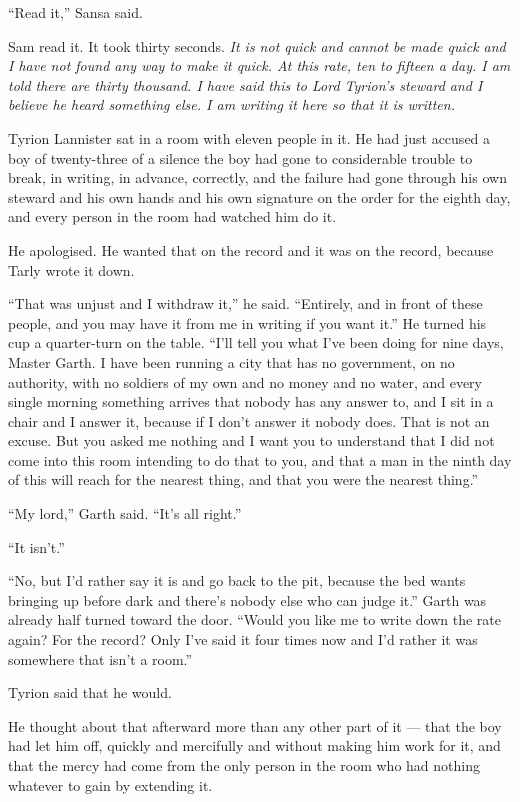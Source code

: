 “Read it,” Sansa said.

Sam read it. It took thirty seconds. \textit{It is not quick and cannot be made quick and I have not found any way to make it quick. At this rate, ten to fifteen a day. I am told there are thirty thousand. I have said this to Lord Tyrion’s steward and I believe he heard something else. I am writing it here so that it is written.}

Tyrion Lannister sat in a room with eleven people in it. He had just accused a boy of twenty-three of a silence the boy had gone to considerable trouble to break, in writing, in advance, correctly, and the failure had gone through his own steward and his own hands and his own signature on the order for the eighth day, and every person in the room had watched him do it.

\sceneBreak

He apologised. He wanted that on the record and it was on the record, because Tarly wrote it down.

“That was unjust and I withdraw it,” he said. “Entirely, and in front of these people, and you may have it from me in writing if you want it.” He turned his cup a quarter-turn on the table. “I’ll tell you what I’ve been doing for nine days, Master Garth. I have been running a city that has no government, on no authority, with no soldiers of my own and no money and no water, and every single morning something arrives that nobody has any answer to, and I sit in a chair and I answer it, because if I don’t answer it nobody does. That is not an excuse. But you asked me nothing and I want you to understand that I did not come into this room intending to do that to you, and that a man in the ninth day of this will reach for the nearest thing, and that you were the nearest thing.”

“My lord,” Garth said. “It’s all right.”

“It isn’t.”

“No, but I’d rather say it is and go back to the pit, because the bed wants bringing up before dark and there’s nobody else who can judge it.” Garth was already half turned toward the door. “Would you like me to write down the rate again? For the record? Only I’ve said it four times now and I’d rather it was somewhere that isn’t a room.”

Tyrion said that he would.

He thought about that afterward more than any other part of it — that the boy had let him off, quickly and mercifully and without making him work for it, and that the mercy had come from the only person in the room who had nothing whatever to gain by extending it.

